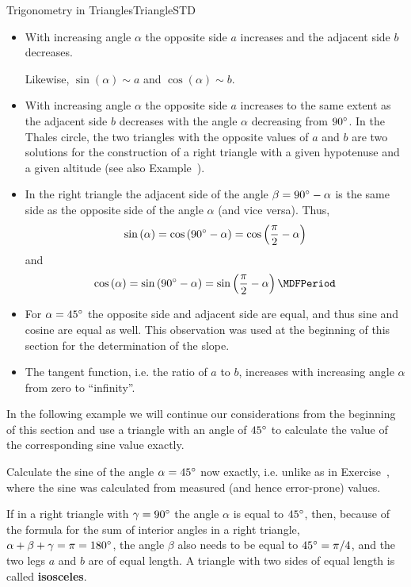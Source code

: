 \begin{MXContent}{Trigonometry in Triangles}{Triangle}{STD}
\begin{itemize}
\item With increasing angle $\alpha$ the opposite side $a$ increases and 
the adjacent side $b$ decreases.

Likewise, $\sin\left(\alpha\right)\sim a$ and 
$\cos\left(\alpha\right)\sim b$.

\item With increasing angle $\alpha$ the opposite side $a$ increases 
to the same extent as the adjacent side $b$ decreases with the angle $\alpha$
decreasing from $90^{\circ}$. In the Thales circle, the two triangles 
with the opposite values of $a$ and $b$ are two solutions for 
the construction of a right triangle with a given hypotenuse and a given 
altitude (see also Example~).

\item In the right triangle the adjacent side of the angle $\beta = 90^{\circ} - \alpha$ is 
the same side as the opposite side of the angle $\alpha$
(and vice versa). Thus, 
\[
\sin\left(\alpha\right)=\cos\left(90\MGrad-\alpha\right) %
 = \cos\left(\frac{\pi}{2}-\alpha\right) %
\]
and 
\[
\cos\left(\alpha\right) = \sin\left(90\MGrad-\alpha\right) %
 = \sin\left(\frac{\pi}{2}-\alpha\right) \MDFPeriod %
\]
%
\item For $\alpha=45^{\circ}$ the opposite side and adjacent side are equal, and thus sine and 
cosine are equal as well. This observation was used at the beginning of this 
section for the determination of the slope.

\item The tangent function, i.e. the ratio of $a$ to $b$, increases with increasing 
angle $\alpha$ from zero to ``infinity''. 
\end{itemize}

In the following example we will continue our considerations from the beginning of this 
section and use a triangle with an angle of $45^{\circ}$ to calculate the value 
of the corresponding sine value exactly.

\begin{MExample}
Calculate the sine of the angle $\alpha=45^{\circ}$ now exactly, i.e. unlike as in 
Exercise~, where the sine was calculated from 
measured (and hence error-prone) values.

If in a right triangle with $\gamma=90^{\circ}$ the angle $\alpha$ is equal to $45^{\circ}$, then, 
because of the formula for the sum of interior angles in a right triangle, $\alpha+\beta+\gamma=\pi=180^{\circ}$,  
the angle $\beta$ also needs to be equal to $45^{\circ}=\pi/4$, and the two legs $a$ and $b$ are 
of equal length. A triangle with two sides of equal length is called \textbf{isosceles}.


\end{MExample}
\end{MXContent}
